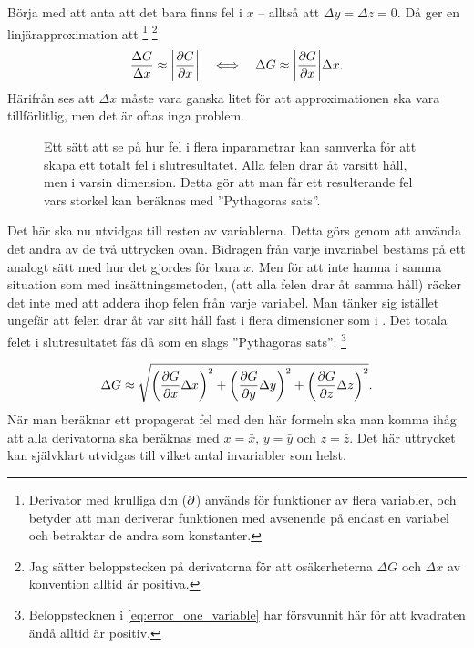 \documentclass[11pt,a4paper, swedish
]{article}
\begin{document}
Börja med att anta att det bara finns fel i $x$ -- alltså att
$\Delta{y}=\Delta{z}=0$. Då ger en linjärapproximation att
\footnote{Derivator med krulliga d:n ($\partial$) används för funktioner av
  flera variabler, och betyder att man deriverar funktionen med
  avsenende på endast en variabel och betraktar de andra som
  konstanter.}
\footnote{Jag sätter beloppstecken på derivatorna för att
  osäkerheterna $\Delta{G}$ och $\Delta{x}$ av konvention alltid är
  positiva.} 
\begin{equation}\label{eq:error_one_variable}
\frac{\Delta{G}}{\Delta{x}} \approx \abs{ \pdv{G}{x} } 
\quad\Longleftrightarrow\quad
\Delta{G} \approx \abs{ \pdv{G}{x} } \Delta{x}.
\end{equation}
Härifrån ses att $\Delta{x}$ måste vara ganska litet för att
approximationen ska vara tillförlitlig, men det är oftas inga problem. 


\begin{figure}
\centering

\caption{Ett sätt att se på hur fel i flera inparametrar kan samverka
  för att skapa ett totalt fel i slutresultatet. Alla felen drar åt
  varsitt håll, men i varsin dimension. Detta gör att man får ett
  resulterande fel vars storkel kan beräknas med ''Pythagoras sats''.}
\label{fig:3D}
\end{figure}

Det här ska nu utvidgas till resten av variablerna. Detta görs genom
att använda det andra av de två uttrycken ovan. Bidragen från varje
invariabel bestäms på ett analogt sätt med hur det gjordes för bara
$x$. 
Men för att inte hamna i samma situation som med insättningsmetoden,
(att alla felen drar åt samma håll) räcker det inte med att addera
ihop felen från varje variabel. 
Man tänker sig istället ungefär att felen drar åt var sitt håll fast i
flera dimensioner som i . Det totala felet i
slutresultatet fås då som en slags ''Pythagoras sats'': 
\footnote{Beloppstecknen i \eqref{eq:error_one_variable} har
  försvunnit här för att kvadraten ändå alltid är positiv. }

\Large
\begin{equation}\label{eq:error_main}
\Delta{G} \approx \sqrt{
\left(\pdv{G}{x}\Delta{x}\right)^2
+\left(\pdv{G}{y}\Delta{y}\right)^2
+\left(\pdv{G}{z}\Delta{z}\right)^2
}.
\end{equation}
\normalsize
När man beräknar ett propagerat fel med den här formeln ska man komma
ihåg att alla derivatorna ska beräknas med $x=\bar{x}$, $y=\bar{y}$
och $ z=\bar{z}$.
Det här uttrycket kan självklart utvidgas till vilket antal
invariabler som helst. 
\end{document}
